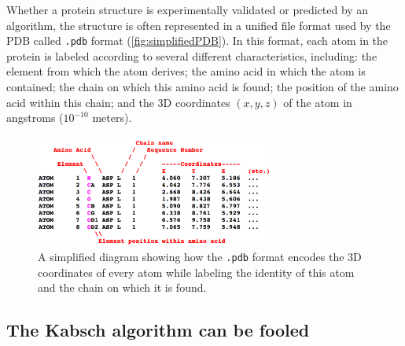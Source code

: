 Whether a protein structure is experimentally validated or predicted by an algorithm, the structure is often represented in a unified file format used by the PDB called \texttt{.pdb} format (\autoref{fig:simplifiedPDB}). In this format, each atom in the protein is labeled according to several different characteristics, including: the element from which the atom derives; the amino acid in which the atom is contained; the chain on which this amino acid is found; the position of the amino acid within this chain; and the 3D coordinates $(x, y, z)$ of the atom in angstroms ($10^{-10}$ meters).\\

\begin{figure}[h]
	\centering
	\mySfFamily
	\includegraphics[width = 0.7\textwidth]{../images/simplifiedPDB.png}
	\caption{A simplified diagram showing how the \texttt{.pdb} format encodes the 3D coordinates of every atom while labeling the identity of this atom and the chain on which it is found.}
	\label{fig:simplifiedPDB}
\end{figure}

\begin{note}\end{note}

\FloatBarrier
{}
\subsection{The Kabsch algorithm can be fooled}

\begin{qbox}\end{qbox}

